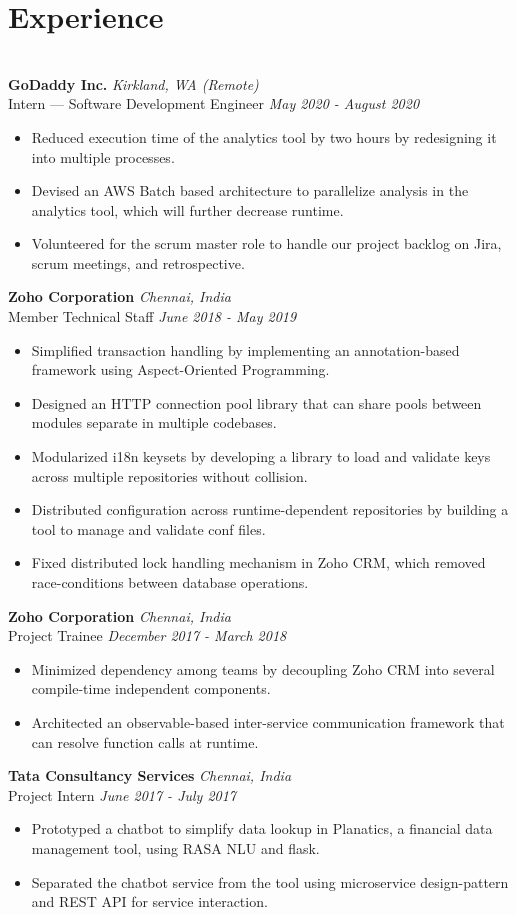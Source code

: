 \documentclass{resume}
\begin{document}
\section*{Experience}
\titlerule
\noindent
\\
\textbf{GoDaddy Inc.} \hfill \textit{Kirkland, WA (Remote)} \\
{\small Intern --- Software Development Engineer} \hfill \textit{\small May 2020 - August 2020}
\begin{itemize}
  \item Reduced execution time of the analytics tool by two hours by redesigning it into multiple processes.
  \item Devised an AWS Batch based architecture to parallelize analysis in the analytics tool, which will further decrease runtime.
  \item Volunteered for the scrum master role to handle our project backlog on Jira, scrum meetings, and retrospective.
\end{itemize}
\textbf{Zoho Corporation} \hfill \textit{Chennai, India} \\
{\small Member Technical Staff} \hfill \textit{\small June 2018 - May 2019}
\begin{itemize}
  \item Simplified transaction handling by implementing an annotation-based framework using Aspect-Oriented Programming.
  \item Designed an HTTP connection pool library that can share pools between modules separate in multiple codebases.
  \item Modularized i18n keysets by developing a library to load and validate keys across multiple repositories without collision.
  \item Distributed configuration across runtime-dependent repositories by building a tool to manage and validate conf files.
  \item Fixed distributed lock handling mechanism in Zoho CRM, which removed race-conditions between database operations.
\end{itemize}
\textbf{Zoho Corporation} \hfill \textit{Chennai, India} \\
{\small Project Trainee} \hfill \textit{\small December 2017 - March 2018}
\begin{itemize}
  \item Minimized dependency among teams by decoupling Zoho CRM into several compile-time independent components.
  \item Architected an observable-based inter-service communication framework that can resolve function calls at runtime.
\end{itemize}
\textbf{Tata Consultancy Services} \hfill \textit{Chennai, India} \\
{\small Project Intern} \hfill \textit{\small June 2017 - July 2017}
\begin{itemize}
  \item Prototyped a chatbot to simplify data lookup in Planatics, a financial data management tool, using RASA NLU and flask.
  \item Separated the chatbot service from the tool using microservice design-pattern and REST API for service interaction.
\end{itemize}
\end{document}
